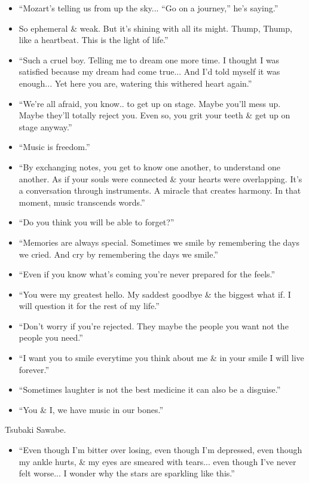 \documentclass{article}
\begin{document}
\begin{enumerate}
\begin{itemize}
    	\item ``Mozart's telling us from up the sky... ``Go on a journey,'' he's saying.''
    	\item So ephemeral \& weak. But it's shining with all its might. Thump, Thump, like a heartbeat. This is the light of life.''
    	\item ``Such a cruel boy. Telling me to dream one more time. I thought I was satisfied because my dream had come true... And I'd told myself it was enough... Yet here you are, watering this withered heart again.''
    	\item ``We're all afraid, you know.. to get up on stage. Maybe you'll mess up. Maybe they'll totally reject you. Even so, you grit your teeth \& get up on stage anyway.''
    	\item ``Music is freedom.''
    	\item ``By exchanging notes, you get to know one another, to understand one another. As if your souls were connected \& your hearts were overlapping. It's a conversation through instruments. A miracle that creates harmony. In that moment, music transcends words.''
    	\item ``Do you think you will be able to forget?''
    	\item ``Memories are always special. Sometimes we smile by remembering the days we cried. And cry by remembering the days we smile.''
    	\item ``Even if you know what's coming you're never prepared for the feels.''
    	\item ``You were my greatest hello. My saddest goodbye \& the biggest what if. I will question it for the rest of my life.''
    	\item ``Don't worry if you're rejected. They maybe the people you want not the people you need.''
    	\item ``I want you to smile everytime you think about me \& in your smile I will live forever.''
    	\item ``Sometimes laughter is not the best medicine it can also be a disguise.''
    	\item ``You \& I, we have music in our bones.''
    \end{itemize}
    {\sc Tsubaki Sawabe.}
    \begin{itemize}
    	\item ``Even though I'm bitter over losing, even though I'm depressed, even though my ankle hurts, \& my eyes are smeared with tears... even though I've never felt worse... I wonder why the stars are sparkling like this.'' 

\end{itemize}
\end{enumerate}
\end{document}
